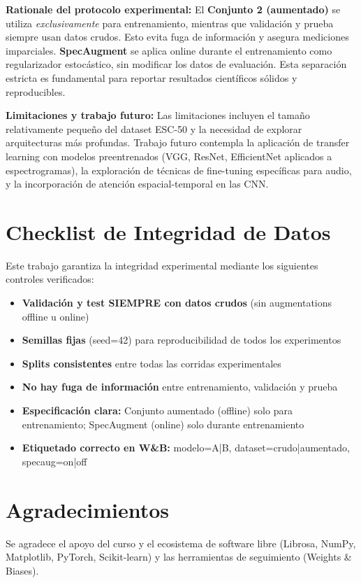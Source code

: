 \documentclass[conference]{IEEEtran}
\begin{document}
\textbf{Rationale del protocolo experimental:} El \textbf{Conjunto 2 (aumentado)} se utiliza \emph{exclusivamente} para entrenamiento, mientras que validación y prueba siempre usan datos crudos. Esto evita fuga de información y asegura mediciones imparciales. \textbf{SpecAugment} se aplica online durante el entrenamiento como regularizador estocástico, sin modificar los datos de evaluación. Esta separación estricta es fundamental para reportar resultados científicos sólidos y reproducibles.

\textbf{Limitaciones y trabajo futuro:} Las limitaciones incluyen el tamaño relativamente pequeño del dataset ESC-50 y la necesidad de explorar arquitecturas más profundas. Trabajo futuro contempla la aplicación de transfer learning con modelos preentrenados (VGG, ResNet, EfficientNet aplicados a espectrogramas), la exploración de técnicas de fine-tuning específicas para audio, y la incorporación de atención espacial-temporal en las CNN.

\section*{Checklist de Integridad de Datos}

Este trabajo garantiza la integridad experimental mediante los siguientes controles verificados:

\begin{itemize}
    \item \textbf{Validación y test SIEMPRE con datos crudos} (sin augmentations offline u online)
    \item \textbf{Semillas fijas} (seed=42) para reproducibilidad de todos los experimentos
    \item \textbf{Splits consistentes} entre todas las corridas experimentales
    \item \textbf{No hay fuga de información} entre entrenamiento, validación y prueba
    \item \textbf{Especificación clara:} Conjunto aumentado (offline) solo para entrenamiento; SpecAugment (online) solo durante entrenamiento
    \item \textbf{Etiquetado correcto en W\&B:} modelo=A|B, dataset=crudo|aumentado, specaug=on|off
\end{itemize}

\section*{Agradecimientos}
Se agradece el apoyo del curso y el ecosistema de software libre (Librosa, NumPy, Matplotlib, PyTorch, Scikit-learn) y las herramientas de seguimiento (Weights \& Biases).
\end{document}
